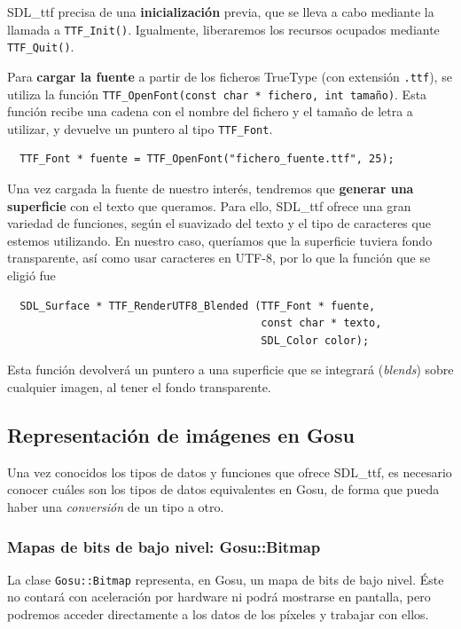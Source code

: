 SDL\_ttf precisa de una \textbf{inicialización} previa, que se lleva a cabo mediante la
llamada a \texttt{TTF\_Init()}. Igualmente, liberaremos los recursos ocupados
mediante \texttt{TTF\_Quit()}.

Para \textbf{cargar la fuente} a partir de los ficheros TrueType (con extensión
\texttt{.ttf}), se utiliza la función \texttt{TTF\_OpenFont(const char * fichero,
  int tamaño)}. Esta función recibe una cadena con el nombre del fichero y el
tamaño de letra a utilizar, y devuelve un puntero al tipo \texttt{TTF\_Font}.

\begin{verbatim}
  TTF_Font * fuente = TTF_OpenFont("fichero_fuente.ttf", 25);
\end{verbatim}

Una vez cargada la fuente de nuestro interés, tendremos que \textbf{generar una
  superficie} con el texto que queramos. Para ello, SDL\_ttf ofrece una gran
variedad de funciones, según el suavizado del texto y el tipo de caracteres que
estemos utilizando. En nuestro caso, queríamos que la superficie tuviera fondo
transparente, así como usar caracteres en UTF-8\cite{refutf8}, por lo que la
función que se eligió fue 
\begin{verbatim}
  SDL_Surface * TTF_RenderUTF8_Blended (TTF_Font * fuente,
                                        const char * texto,
                                        SDL_Color color);
\end{verbatim}

Esta función devolverá un puntero a una superficie que se integrará
(\textit{blends}) sobre cualquier imagen, al tener el fondo transparente.


\subsection{Representación de imágenes en Gosu}

Una vez conocidos los tipos de datos y funciones que ofrece SDL\_ttf, es
necesario conocer cuáles son los tipos de datos equivalentes en Gosu, de forma
que pueda haber una \textit{conversión} de un tipo a otro.

\subsubsection{Mapas de bits de bajo nivel: Gosu::Bitmap}
La clase \texttt{Gosu::Bitmap} representa, en Gosu, un mapa de bits de bajo
nivel. Éste no contará con aceleración por hardware ni podrá mostrarse en
pantalla, pero podremos acceder directamente a los datos de los píxeles y
trabajar con ellos.

